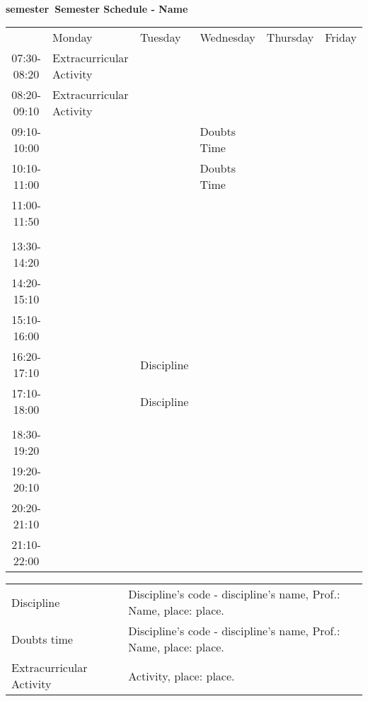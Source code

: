 \documentclass[a4paper,12pt,landscape]{article}
\newcommand{\semester}{semester}
\newcommand{\user}{Name}
\begin{document}
	{\ } \vfill
	\begin{center}
		{\huge \bf \semester\ Semester Schedule - \user}
	\end{center}

	\vfill
	\begin{table}[H]
		\centering
		\begin{spacing}{1.25}
			\begin{tabular}{cC{47mm}C{47mm}C{47mm}C{47mm}C{47mm}}
				\toprule
				& Monday & Tuesday & Wednesday & Thursday & Friday \\
				07:30-08:20& Extracurricular Activity & & & & \\
				08:20-09:10& Extracurricular Activity & & & & \\
				09:10-10:00& & & Doubts Time & & \\
				10:10-11:00& & & Doubts Time & & \\
				11:00-11:50& & & & & \\
				& & & & & \\
				13:30-14:20& & & & & \\
				14:20-15:10& & & & & \\
				15:10-16:00& & & & & \\
				16:20-17:10& & Discipline & & & \\
				17:10-18:00& & Discipline & & & \\
				& & & & & \\
				18:30-19:20& & & & & \\
				19:20-20:10& & & & & \\
				20:20-21:10& & & & & \\
				21:10-22:00& & & & & \\
				\bottomrule
			\end{tabular}
		\end{spacing}
	\end{table}
	\vfill
	\begin{table}[H]
		\raggedright
		\begin{spacing}{1.25}
			\begin{tabular}{C{47mm}l}
				Discipline& Discipline's code - discipline's name, Prof.: Name, place: place.\\
				Doubts time& Discipline's code - discipline's name, Prof.: Name, place: place.\\
				Extracurricular Activity& Activity, place: place.
			\end{tabular}
		\end{spacing}
	\end{table}
	\vfill
\end{document}

